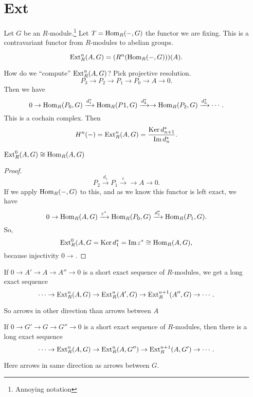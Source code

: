 \section{Ext}
Let $G$ be an $R$-module.\footnote{Annoying notation}
Let $T = \operatorname{Hom}_R(-, G)$ the functor we are fixing.
This is a contravariant functor from $R$-modules to abelian groups.

\begin{definition}
    \[
        \operatorname{Ext}^{n}_R(A, G) = (R^{n}(\operatorname{Hom}_{R}(-, G)))(A)
    .\] 
\end{definition}
How do we ``compute'' $\operatorname{Ext} ^{n}_R (A, G)$?
Pick projective resolution.
\[
P_3 \to  P_2 \to  P_1 \to  P_0 \to  A \to  0
.\] 
Then we have
\[
0 \to  \operatorname{Hom}_{R}(P_0, G) \xrightarrow{d_1^{*}}  \operatorname{Hom}_{R}(P1,G) \xrightarrow{d_2^{*}}  \to  \operatorname{Hom}_{R}(P_2, G) \xrightarrow{d_3^{*}}    \cdots
.\] 
This is a cochain complex.
Then 
\[
    H^{n}(-) = \operatorname{Ext}_R^{n}(A, G) = \frac{\operatorname{Ker} d_{n+1}^{*}}{\operatorname{Im} d_n^{*}}
.\] 

\begin{prop}[2.9]
    $\operatorname{Ext}_R^{0}(A, G) \cong \operatorname{Hom}_{R}(A, G)$
\end{prop}
\begin{proof}
    \[
    P_2  \xrightarrow{d_1}  P_1 \xrightarrow{\epsilon} \to  A \to  0
    .\] 
    If we apply $\operatorname{Hom}_{R}(-, G)$ to this, and as we know this functor is left exact, we have
    \[
    0 \to \operatorname{Hom}_{R}(A, G) \xrightarrow{\varepsilon^{*}} \operatorname{Hom}_{R}(P_0, G) \xrightarrow{d_1^{*}}  \operatorname{Hom}_{R}(P_1, G)
    .\] 
    So,
    \[
        \operatorname{Ext}_R^{0}(A, G = \operatorname{Ker} d_1^{*} = \operatorname{Im} \varepsilon^{*} \cong \operatorname{Hom}_{R}(A, G)
    ,\] 
    because injectivity $0 \to $.
\end{proof}

\begin{theorem}[2.10]
    If $0 \to  A' \to  A \to  A'' \to  0$ is a short exact sequence of $R$-modules, we get a long exact sequence
    \[
        \cdots \to \operatorname{Ext}_R^{n}(A, G) \to  \operatorname{Ext}_R^{n}(A', G) \to  \operatorname{Ext}_R^{n+1}(A'', G) \to  \cdots
    .\] 
\end{theorem}
So arrows in other direction than arrows between $A$

\begin{theorem}[2.11]
    If $0\to  G' \to  G \to  G'' \to  0$ is a short exact sequence of $R$-modules, then there is a long exact sequence
    \[
        \cdots \to \operatorname{Ext}_R^{n}(A, G) \to  \operatorname{Ext}_R^{n}(A, G'') \to  \operatorname{Ext}_R^{n+1}(A, G') \to  \cdots
    .\] 
\end{theorem}
Here arrows in same direction as arrows between $G$.

